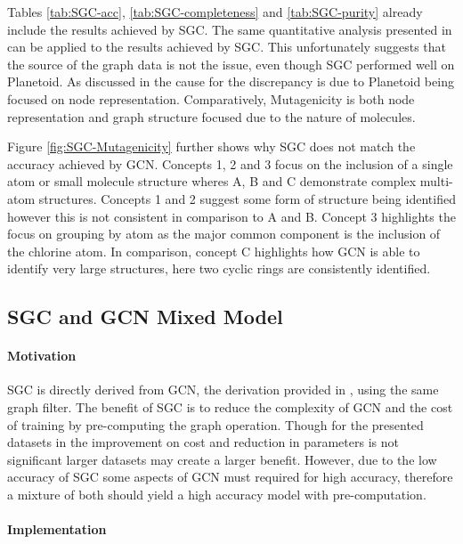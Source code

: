 Tables \ref{tab:SGC-acc}, \ref{tab:SGC-completeness} and \ref{tab:SGC-purity} already include the results achieved by SGC.
The same quantitative analysis presented in  can be applied to the results achieved by SGC.
This unfortunately suggests that the source of the graph data is not the issue, even though SGC performed well on Planetoid\cite{Fey/Lenssen/2019}.
As discussed in  the cause for the discrepancy is due to Planetoid\cite{Fey/Lenssen/2019} being focused on node representation.
Comparatively, Mutagenicity is both node representation and graph structure focused due to the nature of molecules.

Figure \ref{fig:SGC-Mutagenicity} further shows why SGC does not match the accuracy achieved by GCN.
Concepts 1, 2 and 3 focus on the inclusion of a single atom or small molecule structure wheres A, B and C demonstrate complex multi-atom structures.
Concepts 1 and 2 suggest some form of structure being identified however this is not consistent in comparison to A and B.
Concept 3 highlights the focus on grouping by atom as the major common component is the inclusion of the chlorine atom.
In comparison, concept C highlights how GCN is able to identify very large structures, here two cyclic rings are consistently identified.

\subsection{SGC and GCN Mixed Model}


\paragraph{Motivation}
SGC is directly derived from GCN, the derivation provided in , using the same graph filter.
The benefit of SGC is to reduce the complexity of GCN and the cost of training by pre-computing the graph operation.
Though for the presented datasets in  the improvement on cost and reduction in parameters is not significant larger datasets may create a larger benefit.
However, due to the low accuracy of SGC some aspects of GCN must required for high accuracy, therefore a mixture of both should yield a high accuracy model with pre-computation.

\paragraph{Implementation}

